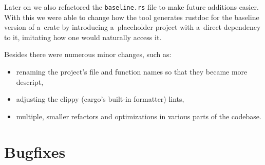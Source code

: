 \documentclass[licencjacka,en]{pracamgr}
\begin{document}

Later on we also refactored the \texttt{baseline.rs} file to make future additions easier. With this
we were able to change how the tool generates rustdoc for the baseline version of a~crate
by introducing a~placeholder project with a~direct dependency to it, imitating how one would
naturally access it.

Besides there were numerous minor changes, such as:
\begin{itemize}
	\item renaming the project's file and function names so that they became more descript,
	\item adjusting the clippy (cargo's built-in formatter) lints,
	\item multiple, smaller refactors and optimizations in various parts of the codebase.
\end{itemize}

\section{Bugfixes}\label{r:section_bugfixes}
\end{document}
